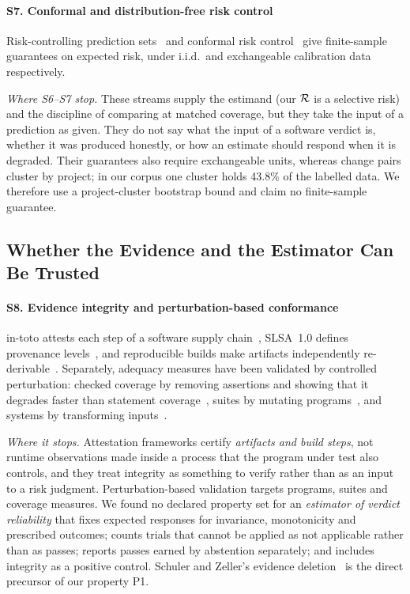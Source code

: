 \paragraph*{S7. Conformal and distribution-free risk control} Risk-controlling prediction sets~\cite{bates2021distribution} and conformal risk control~\cite{angelopoulos2024conformal} give finite-sample guarantees on expected risk, under i.i.d.\ and exchangeable calibration data respectively.

\emph{Where S6--S7 stop.} These streams supply the estimand (our $\mathcal{R}$ is a selective risk) and the discipline of comparing at matched coverage, but they take the input of a prediction as given. They do not say what the input of a software verdict is, whether it was produced honestly, or how an estimate should respond when it is degraded. Their guarantees also require exchangeable units, whereas change pairs cluster by project; in our corpus one cluster holds 43.8\% of the labelled data. We therefore use a project-cluster bootstrap bound and claim no finite-sample guarantee.

\subsection{Whether the Evidence and the Estimator Can Be Trusted}
\paragraph*{S8. Evidence integrity and perturbation-based conformance} in-toto attests each step of a software supply chain~\cite{torresarias2019intoto}, SLSA~1.0 defines provenance levels~\cite{slsa2023spec}, and reproducible builds make artifacts independently re-derivable~\cite{lamb2022reproducible}. Separately, adequacy measures have been validated by controlled perturbation: checked coverage by removing assertions and showing that it degrades faster than statement coverage~\cite{schuler2011assessing}, suites by mutating programs~\cite{jia2011analysis,niedermayr2016will}, and systems by transforming inputs~\cite{chen2018metamorphic}.

\emph{Where it stops.} Attestation frameworks certify \emph{artifacts and build steps}, not runtime observations made inside a process that the program under test also controls, and they treat integrity as something to verify rather than as an input to a risk judgment. Perturbation-based validation targets programs, suites and coverage measures. We found no declared property set for an \emph{estimator of verdict reliability} that fixes expected responses for invariance, monotonicity and prescribed outcomes; counts trials that cannot be applied as not applicable rather than as passes; reports passes earned by abstention separately; and includes integrity as a positive control. Schuler and Zeller's evidence deletion~\cite{schuler2011assessing} is the direct precursor of our property P1.

